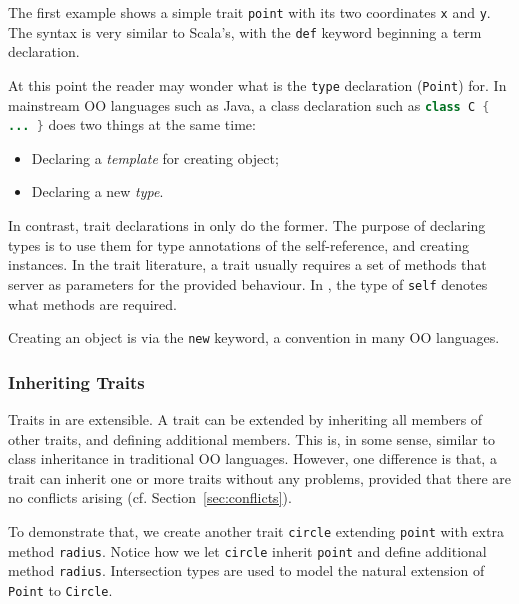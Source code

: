 The first example shows a simple trait \lstinline{point} with its two
coordinates \lstinline{x} and \lstinline{y}.
The syntax is very similar to Scala's, with the \lstinline{def} keyword
beginning a term declaration.

At this point the reader may wonder what is the \lstinline{type} declaration
(\lstinline$Point$) for. In mainstream OO languages such as Java, a class
declaration such as \lstinline[language=java]$class C { ... }$ does two things
at the same time:

\begin{itemize}
\item Declaring a \textit{template} for creating object;
\item Declaring a new \textit{type}.
\end{itemize}

In contrast, trait declarations in \name only do the former. The purpose of
declaring types is to use them for type annotations of the self-reference, and
creating instances. In the trait literature, a trait usually requires a set of
methods that server as parameters for the provided behaviour. In \name, the type
of \lstinline$self$ denotes what methods are required.

Creating an object is via the \lstinline{new} keyword, a convention in many OO
languages.

\subsubsection{Inheriting Traits}

Traits in \name are extensible. A trait can be extended by inheriting all
members of other traits, and defining additional members. This is, in some
sense, similar to class inheritance in traditional OO languages. However, one
difference is that, a trait can inherit one or more traits without any problems,
provided that there are no conflicts arising (cf. Section~\ref{sec:conflicts}).

To demonstrate that, we create another trait \lstinline$circle$ extending
\lstinline{point} with extra method \lstinline{radius}.
Notice how we let \lstinline{circle} inherit \lstinline{point} and define
additional method \lstinline{radius}. Intersection types are used to model the
natural extension of \lstinline{Point} to \lstinline{Circle}.

